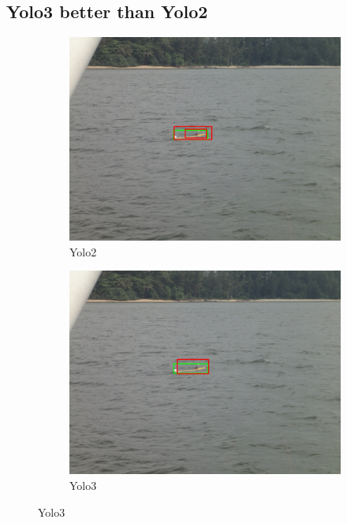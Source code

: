 \subsection{Yolo3 better than Yolo2}
\label{sec:3better}
\begin{figure}[h!]
\begin{subfigure}{.5\textwidth}
  \centering
  \includegraphics[width=0.9\linewidth]{results/case_buildings/yolo23/3better/yolo2/DSC02490.jpg}
  \caption{Yolo2}
\end{subfigure}%
\begin{subfigure}{.5\textwidth}
  \centering
  \includegraphics[width=.9\linewidth]{results/case_buildings/yolo23/3better/yolo3/DSC02490.jpg}
  \caption{Yolo3}
\end{subfigure}


\end{figure}
